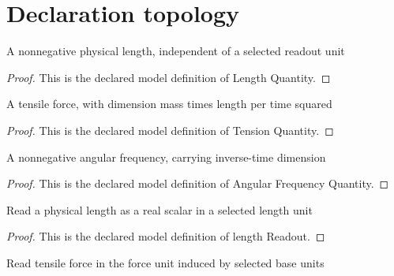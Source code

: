 \section{Declaration topology}
\begin{definition}
  \label{def:physics:phyx-mini-0287:phyxminiproblems-problemphyxmini0287-lengthquantity}
  A nonnegative physical length, independent of a selected readout unit
\end{definition}
\begin{proof}
  This is the declared model definition of Length Quantity.
\end{proof}
\begin{definition}
  \label{def:physics:phyx-mini-0287:phyxminiproblems-problemphyxmini0287-tensionquantity}
  A tensile force, with dimension mass times length per time squared
\end{definition}
\begin{proof}
  This is the declared model definition of Tension Quantity.
\end{proof}
\begin{definition}
  \label{def:physics:phyx-mini-0287:phyxminiproblems-problemphyxmini0287-angularfrequencyquantity}
  A nonnegative angular frequency, carrying inverse-time dimension
\end{definition}
\begin{proof}
  This is the declared model definition of Angular Frequency Quantity.
\end{proof}
\begin{definition}
  \label{def:physics:phyx-mini-0287:phyxminiproblems-problemphyxmini0287-lengthreadout}
  Read a physical length as a real scalar in a selected length unit
\end{definition}
\begin{proof}
  This is the declared model definition of length Readout.
\end{proof}
\begin{definition}
  \label{def:physics:phyx-mini-0287:phyxminiproblems-problemphyxmini0287-tensionreadout}
  Read tensile force in the force unit induced by selected base units
\end{definition}
